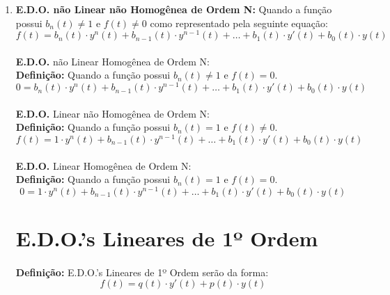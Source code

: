 \documentclass{article}
\begin{document}
            \begin{enumerate}[rightmargin = \leftmargin]
                \item \textbf{E.D.O. não Linear não Homogênea de Ordem N:} Quando a função possui $b_{n}(t) \neq 1$ e $f(t) \neq 0$ como representado pela seguinte equação:
                    \begin{equation*}
                        f(t) = 
                        b_{n}(t)   \cdot y^{n}(t) + 
                        b_{n-1}(t) \cdot y^{n-1}(t) + \dots +
                        b_{1}(t) \cdot y'(t) + 
                        b_{0}(t) \cdot y(t)
                    \end{equation*}

        \paragraph{}\textbf{E.D.O.} não Linear Homogênea de Ordem N:\\
        \textbf{Definição:} Quando a função possui $b_{n}(t) \neq 1$ e $f(t) = 0$.
            \[0 = b_{n}(t) \cdot y^{n}(t) + b_{n-1}(t) \cdot y^{n-1}(t) + \dots +b_{1}(t) \cdot y'(t) + b_{0}(t) \cdot y(t)\]
        
        \paragraph{}\textbf{E.D.O.} Linear não Homogênea de Ordem N:\\
        \textbf{Definição:} Quando a função possui $b_{n}(t) = 1$ e $f(t) \neq 0$.
            \[f(t) = 1 \cdot y^{n}(t) + b_{n-1}(t) \cdot y^{n-1}(t) + \dots +b_{1}(t) \cdot y'(t) + b_{0}(t) \cdot y(t)\]
        
        \paragraph{}\textbf{E.D.O.} Linear Homogênea de Ordem N:\\
        \textbf{Definição:} Quando a função possui $b_{n}(t) = 1$ e $f(t) = 0$.
            \[0 = 1 \cdot y^{n}(t) + b_{n-1}(t) \cdot y^{n-1}(t) + \dots +b_{1}(t) \cdot y'(t) + b_{0}(t) \cdot y(t)\]
\newpage

\section{E.D.O.'s Lineares de 1º Ordem}
    \paragraph{}\textbf{Definição:} E.D.O.'s Lineares de 1º Ordem serão da forma:
        \[f(t) = q(t) \cdot y'(t) + p(t) \cdot y(t)\]
    

\end{enumerate}
\end{document}
